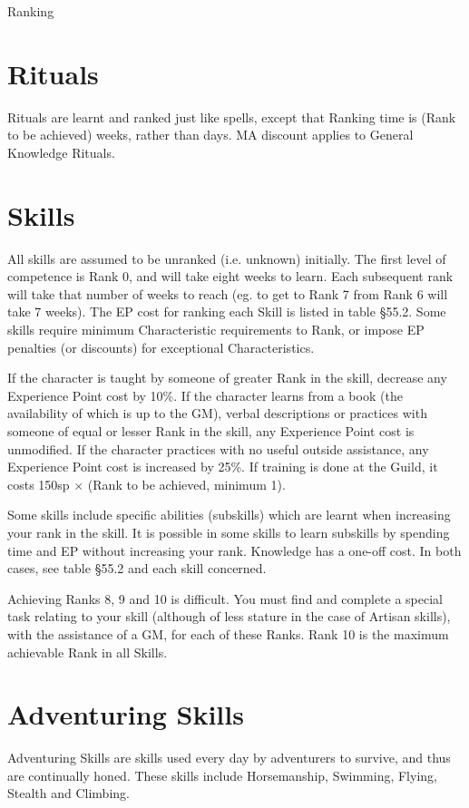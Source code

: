 \begin{Chapter}{Ranking}
\section{Rituals}

Rituals are learnt and ranked just like spells, except that Ranking
time is (Rank to be achieved) weeks, rather than days.  MA discount
applies to General Knowledge Rituals.

\section{Skills}

All skills are assumed to be unranked (i.e.  unknown) initially.  The
first level of competence is Rank 0, and will take eight weeks to
learn.  Each subsequent rank will take that number of weeks to reach
(eg. to get to Rank 7 from Rank 6 will take 7 weeks). The EP cost for
ranking each Skill is listed in table §55.2. Some skills require
minimum Characteristic requirements to Rank, or impose EP penalties
(or discounts) for exceptional Characteristics.

If the character is taught by someone of greater Rank in the skill,
decrease any Experience Point cost by 10\%.  If the character learns
from a book (the availability of which is up to the GM), verbal
descriptions or practices with someone of equal or lesser Rank in the
skill, any Experience Point cost is unmodified.  If the character
practices with no useful outside assistance, any Experience Point cost
is increased by 25\%. If training is done at the Guild, it costs 150sp
× (Rank to be achieved, minimum 1).

Some skills include specific abilities (subskills) which are learnt
when increasing your rank in the skill. It is possible in some skills
to learn subskills by spending time and EP without increasing your
rank. Knowledge has a one-off cost. In both cases, see table §55.2 and
each skill concerned.

Achieving Ranks 8, 9 and 10 is difficult. You must find and complete a
special task relating to your skill (although of less stature in the
case of Artisan skills), with the assistance of a GM, for each of
these Ranks.  Rank 10 is the maximum achievable Rank in all Skills.

\section{Adventuring Skills}

Adventuring Skills are skills used every day by adventurers to
survive, and thus are continually honed.  These skills include
Horsemanship, Swimming, Flying, Stealth and Climbing.


\end{Chapter}
